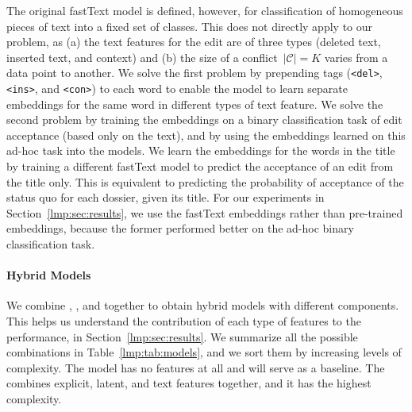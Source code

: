 The original fastText model is defined, however, for classification of homogeneous pieces of text into a fixed set of classes.
This does not directly apply to our problem, as (a) the text features for the edit are of three types (deleted text, inserted text, and context) and (b) the size of a conflict~$\vert \mathcal{C} \vert = K$ varies from a data point to another.
We solve the first problem by prepending tags (\texttt{<del>}, \texttt{<ins>}, and \texttt{<con>}) to each word to enable the model to learn separate embeddings for the same word in different types of text feature.
We solve the second problem by training the embeddings on a binary classification task of edit acceptance (based only on the text), and by using the embeddings learned on this ad-hoc task into the \wow{} models.
We learn the embeddings for the words in the title by training a different fastText model to predict the acceptance of an edit from the title only.
This is equivalent to predicting the probability of acceptance of the status quo for each dossier, given its title.
For our experiments in Section~\ref{lmp:sec:results}, we use the fastText embeddings rather than pre-trained embeddings, because the former performed better on the ad-hoc binary classification task.

\paragraph{Hybrid Models}

We combine , , and  together to obtain hybrid models with different components.
This helps us understand the contribution of each type of features to the performance, in Section~\ref{lmp:sec:results}.
We summarize all the possible combinations in Table~\ref{lmp:tab:models}, and we sort them by increasing levels of complexity.
The \wow{} model has no features at all and will serve as a baseline.
The  combines explicit, latent, and text features together, and it has the highest complexity.

